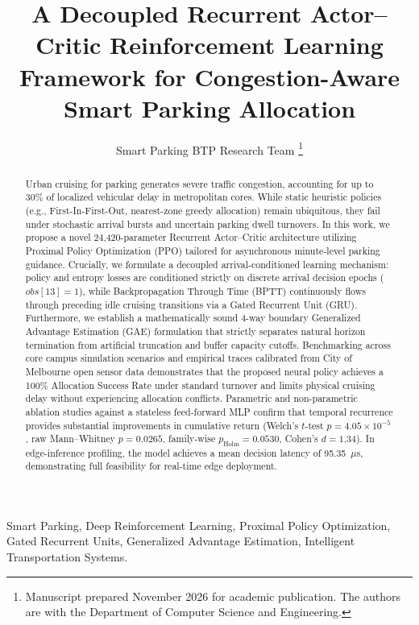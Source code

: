 \documentclass[journal]{IEEEtran}
\begin{document}
\title{A Decoupled Recurrent Actor--Critic Reinforcement Learning Framework for Congestion-Aware Smart Parking Allocation}

\author{Smart Parking BTP Research Team%
\thanks{Manuscript prepared November 2026 for academic publication. The authors are with the Department of Computer Science and Engineering.}}

\maketitle

\begin{abstract}
Urban cruising for parking generates severe traffic congestion, accounting for up to 30\% of localized vehicular delay in metropolitan cores. While static heuristic policies (e.g., First-In-First-Out, nearest-zone greedy allocation) remain ubiquitous, they fail under stochastic arrival bursts and uncertain parking dwell turnovers. In this work, we propose a novel 24,420-parameter Recurrent Actor--Critic architecture utilizing Proximal Policy Optimization (PPO) tailored for asynchronous minute-level parking guidance. Crucially, we formulate a decoupled arrival-conditioned learning mechanism: policy and entropy losses are conditioned strictly on discrete arrival decision epochs ($obs[13] = 1$), while Backpropagation Through Time (BPTT) continuously flows through preceding idle cruising transitions via a Gated Recurrent Unit (GRU). Furthermore, we establish a mathematically sound 4-way boundary Generalized Advantage Estimation (GAE) formulation that strictly separates natural horizon termination from artificial truncation and buffer capacity cutoffs. Benchmarking across core campus simulation scenarios and empirical traces calibrated from City of Melbourne open sensor data demonstrates that the proposed neural policy achieves a 100\% Allocation Success Rate under standard turnover and limits physical cruising delay without experiencing allocation conflicts. Parametric and non-parametric ablation studies against a stateless feed-forward MLP confirm that temporal recurrence provides substantial improvements in cumulative return (Welch's $t$-test $p = 4.05 \times 10^{-5}$, raw Mann--Whitney $p = 0.0265$, family-wise $p_{\text{Holm}} = 0.0530$, Cohen's $d = 1.34$). In edge-inference profiling, the model achieves a mean decision latency of 95.35~$\mu$s, demonstrating full feasibility for real-time edge deployment.
\end{abstract}

\begin{IEEEkeywords}
Smart Parking, Deep Reinforcement Learning, Proximal Policy Optimization, Gated Recurrent Units, Generalized Advantage Estimation, Intelligent Transportation Systems.
\end{IEEEkeywords}
\end{document}
